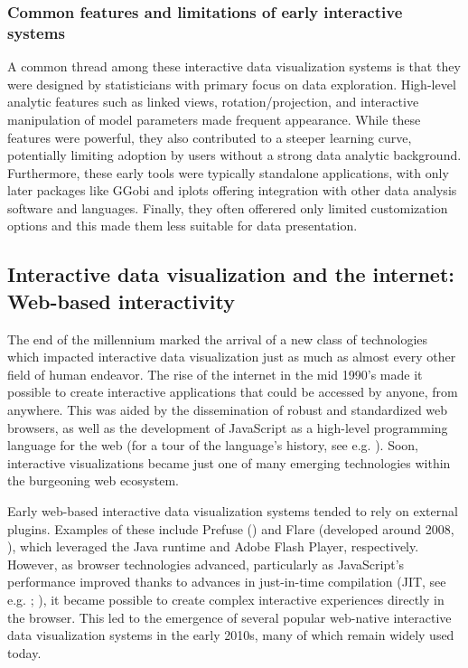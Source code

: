 \documentclass[
]{book}
\theoremstyle{definition}
\theoremstyle{definition}
\theoremstyle{definition}
\theoremstyle{definition}
\theoremstyle{remark}
\begin{document}
\subsubsection{Common features and limitations of early interactive systems}\label{common-features-and-limitations-of-early-interactive-systems}

A common thread among these interactive data visualization systems is that they were designed by statisticians with primary focus on data exploration. High-level analytic features such as linked views, rotation/projection, and interactive manipulation of model parameters made frequent appearance. While these features were powerful, they also contributed to a steeper learning curve, potentially limiting adoption by users without a strong data analytic background. Furthermore, these early tools were typically standalone applications, with only later packages like GGobi and iplots offering integration with other data analysis software and languages. Finally, they often offerered only limited customization options and this made them less suitable for data presentation.

\subsection{Interactive data visualization and the internet: Web-based interactivity}\label{web-based}

The end of the millennium marked the arrival of a new class of technologies which impacted interactive data visualization just as much as almost every other field of human endeavor. The rise of the internet in the mid 1990's made it possible to create interactive applications that could be accessed by anyone, from anywhere. This was aided by the dissemination of robust and standardized web browsers, as well as the development of JavaScript as a high-level programming language for the web (for a tour of the language's history, see e.g. ). Soon, interactive visualizations became just one of many emerging technologies within the burgeoning web ecosystem.

Early web-based interactive data visualization systems tended to rely on external plugins. Examples of these include Prefuse () and Flare (developed around 2008, ), which leveraged the Java runtime and Adobe Flash Player, respectively. However, as browser technologies advanced, particularly as JavaScript's performance improved thanks to advances in just-in-time compilation (JIT, see e.g. ; ), it became possible to create complex interactive experiences directly in the browser. This led to the emergence of several popular web-native interactive data visualization systems in the early 2010s, many of which remain widely used today.
\end{document}
